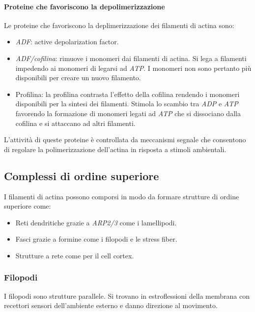 			\paragraph{Proteine che favoriscono la depolimerizzazione}
			Le proteine che favoriscono la deplimerizzazione dei filamenti di actina sono:
			\begin{multicols}{2}
				\begin{itemize}
					\item \emph{ADF}: active depolarization factor.
					\item \emph{ADF/cofilina}: rimuove i monomeri dai filamenti di actina.
						Si lega a filamenti impedendo ai monomeri di legarsi ad \emph{ATP}.
						I monomeri non sono pertanto pi\`u disponibili per creare un nuovo filamento.
					\item Profilina: la profilina contrasta l'effetto della cofilina rendendo i monomeri disponibili per la sintesi dei filamenti.
						Stimola lo scambio tra \emph{ADP} e \emph{ATP} favorendo la formazione di monomeri legati ad \emph{ATP} che si dissociano dalla cofilina e si attaccano ad altri filamenti.
				\end{itemize}
			\end{multicols}
			L'attivit\`a di queste proteine \`e controllata da meccanismi segnale che consentono di regolare la polimerizzazione dell'actina in risposta a stimoli ambientali.
		
	\subsection{Complessi di ordine superiore}
	I filamenti di actina possono comporsi in modo da formare strutture di ordine superiore come:
	\begin{multicols}{2}
		\begin{itemize}
			\item Reti dendritiche grazie a \emph{ARP2/3} come i lamellipodi.
			\item Fasci grazie a formine come i filopodi e le stress fiber.
			\item Strutture a rete come per il cell cortex.
		\end{itemize}
	\end{multicols}

		\subsubsection{Filopodi}
		I filopodi sono strutture parallele.
		Si trovano in estroflessioni della membrana con recettori sensori dell'ambiente esterno e danno direzione al movimento.

